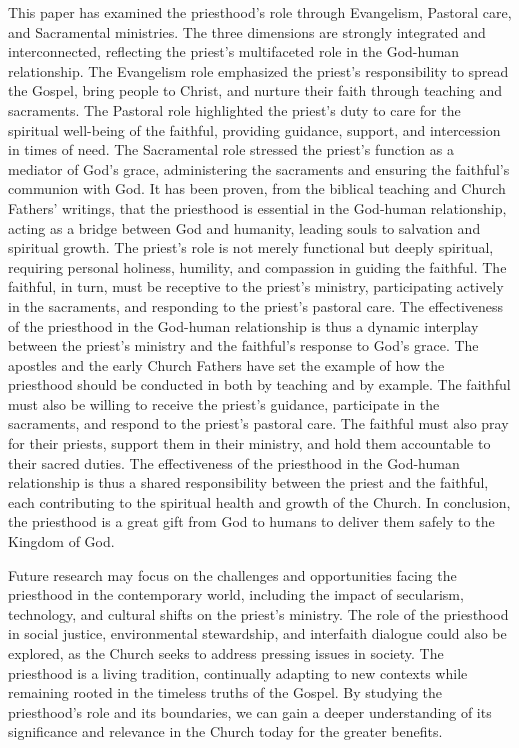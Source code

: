 \documentclass[12pt,doc]{apa7}   	%
\begin{document}
This paper has examined the priesthood’s role through Evangelism, Pastoral care, and Sacramental ministries. The three dimensions are strongly integrated and interconnected, reflecting the priest’s multifaceted role in the God-human relationship. The Evangelism role emphasized the priest’s responsibility to spread the Gospel, bring people to Christ, and nurture their faith through teaching and sacraments. The Pastoral role highlighted the priest’s duty to care for the spiritual well-being of the faithful, providing guidance, support, and intercession in times of need. The Sacramental role stressed the priest’s function as a mediator of God’s grace, administering the sacraments and ensuring the faithful’s communion with God.  It has been proven, from the biblical teaching and Church Fathers' writings, that the priesthood is essential in the God-human relationship, acting as a bridge between God and humanity, leading souls to salvation and spiritual growth.  The priest’s role is not merely functional but deeply spiritual, requiring personal holiness, humility, and compassion in guiding the faithful.  The faithful, in turn, must be receptive to the priest’s ministry, participating actively in the sacraments, and responding to the priest’s pastoral care.  The effectiveness of the priesthood in the God-human relationship is thus a dynamic interplay between the priest’s ministry and the faithful’s response to God’s grace.  The apostles and the early Church Fathers have set the example of how the priesthood should be conducted in both by teaching and by example.  The faithful must also be willing to receive the priest’s guidance, participate in the sacraments, and respond to the priest’s pastoral care.  The faithful must also pray for their priests, support them in their ministry, and hold them accountable to their sacred duties.  The effectiveness of the priesthood in the God-human relationship is thus a shared responsibility between the priest and the faithful, each contributing to the spiritual health and growth of the Church.  In conclusion, the priesthood is a great gift from God to humans to deliver them safely to the Kingdom of God.

Future research may focus on the challenges and opportunities facing the priesthood in the contemporary world, including the impact of secularism, technology, and cultural shifts on the priest’s ministry.  The role of the priesthood in social justice, environmental stewardship, and interfaith dialogue could also be explored, as the Church seeks to address pressing issues in society.  The priesthood is a living tradition, continually adapting to new contexts while remaining rooted in the timeless truths of the Gospel.  By studying the priesthood’s role and its boundaries, we can gain a deeper understanding of its significance and relevance in the Church today for the greater benefits.
\end{document}
